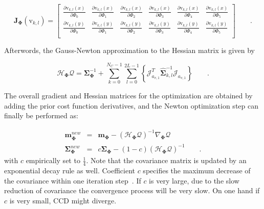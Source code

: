 \begin{equation}
  \label{eq:bigj}
\mathbf{J}_{\mathbf{\Phi}}(\mathrm{v}_{k,l}) =
\left[ {\begin{array}{cccccc}
\frac{\partial \mathrm{v}_{k,l}(x)}{\partial \Phi_0}& \frac{\partial \mathrm{v}_{k,l}(x)}{\partial \Phi_1}& \frac{\partial \mathrm{v}_{k,l}(x)}{\partial \Phi_2}& \frac{\partial \mathrm{v}_{k,l}(x)}{\partial \Phi_3}&\frac{\partial \mathrm{v}_{k,l}(x)}{\partial \Phi_4} &\frac{\partial \mathrm{v}_{k,l}(x)}{\partial \Phi_5}  \\
\frac{\partial \mathrm{v}_{k,l}(y)}{\partial \Phi_0}& \frac{\partial \mathrm{v}_{k,l}(y)}{\partial \Phi_1}& \frac{\partial \mathrm{v}_{k,l}(y)}{\partial \Phi_2}& \frac{\partial \mathrm{v}_{k,l}(y)}{\partial \Phi_3}&\frac{\partial \mathrm{v}_{k,l}(y)}{\partial \Phi_4} &\frac{\partial \mathrm{v}_{k,l}(y)}{\partial \Phi_5}  \\
 \end{array} } \right]\qquad.
\end{equation}

Afterwords, the Gauss-Newton approximation to the Hessian
matrix is given by

\begin{equation}
  \label{eq:hessian}
  \mathcal{H}_{\mathbf{\Phi}} \mathcal{Q}  =
  \mathbf{\Sigma}_{\mathbf{\Phi}}^{-1} + \sum_{k = 0}^{N_{C}-1}
  \sum_{l=0}^{2L-1} \left\{\mathcal{J}_{a_{v,1}}^T\hat{\mathbf{\Sigma}}_{k,l}^{-1}\mathcal{J}_{a_{v,1}}\right\}\qquad.
\end{equation}


The overall gradient and Hessian matrices for the optimization
are obtained by adding the prior cost function
derivatives, and the Newton optimization step can finally be
performed as:

\begin{eqnarray}
\label{eq:newton}
  \mathbf{m}_{\mathbf{\Phi}}^{new} & = &
  \mathbf{m}_{\mathbf{\Phi}} - (\mathcal{H}_{\mathbf{\Phi}}
  \mathcal{Q})^{-1} \nabla_{\mathbf{\Phi}} \mathcal{Q} \nonumber \\
  \mathbf{\Sigma}_{\mathbf{\Phi}}^{new} & = &
  c\mathbf{\Sigma}_{\mathbf{\Phi}} - (1-c)(\mathcal{H}_{\mathbf{\Phi}}
  \mathcal{Q})^{-1}\qquad.
\end{eqnarray}
with $c$ empirically set to $\frac{1}{4}$. Note that the covariance
matrix is updated by an exponential decay rule as well. Coefficient $c$ specifies the
maximum decrease of the covariance within one iteration
step~\cite{hanek2004contracting}. If $c$ is very large, due to the slow reduction of covariance the
convergence process will be very slow. On one hand if $c$ is
very small, CCD might diverge.


